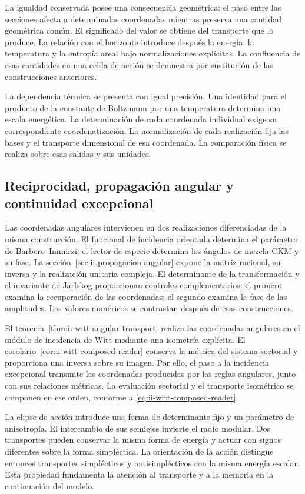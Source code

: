 La igualdad conservada posee una consecuencia geométrica:
el paso entre las secciones afecta a determinadas coordenadas mientras
preserva una cantidad geométrica común. El significado del valor se
obtiene del transporte que lo produce. La relación con el horizonte
introduce después la energía, la temperatura y la entropía areal bajo
normalizaciones explícitas. La confluencia de esas cantidades en una
celda de acción se demuestra por sustitución de las construcciones
anteriores.

La dependencia térmica se presenta con igual precisión. Una identidad
para el producto de la constante de Boltzmann por una temperatura
determina una escala energética. La determinación de cada coordenada
individual exige su correspondiente coordenatización. La normalización de cada realización fija las bases y el transporte
dimensional de esa coordenada.
La comparación física se realiza sobre esas salidas y sus unidades.

\subsection{Reciprocidad, propagación angular y continuidad excepcional}

Las coordenadas angulares intervienen en dos realizaciones diferenciadas
de la misma construcción. El funcional de incidencia orientada determina
el parámetro de Barbero--Immirzi; el lector de especie determina los
ángulos de mezcla CKM y su fase. La sección~\ref{sec:ii-propagacion-angular}
expone la matriz racional, su inversa y la realización unitaria compleja.
El determinante de la transformación y el invariante de Jarlskog
proporcionan controles complementarios: el primero examina la recuperación
de las coordenadas; el segundo examina la fase de las amplitudes. Los
valores numéricos se contrastan después de esas construcciones.

El teorema~\ref{thm:ii-witt-angular-transport} realiza las coordenadas
angulares en el módulo de incidencia de Witt mediante una isometría
explícita. El corolario~\ref{cor:ii-witt-composed-reader} conserva la
métrica del sistema sectorial y proporciona una inversa sobre su imagen.
Por ello, el paso a la incidencia excepcional transmite las coordenadas
producidas por las reglas angulares, junto con sus relaciones métricas.
La evaluación sectorial y el transporte isométrico se componen en ese
orden, conforme a \eqref{eq:ii-witt-composed-reader}.

La elipse de acción introduce una forma de determinante fijo y un
parámetro de anisotropía. El intercambio de sus semiejes invierte el
radio modular. Dos transportes pueden conservar la misma forma de
energía y actuar con signos diferentes sobre la forma simpléctica.
La orientación de la acción distingue entonces transportes simplécticos
y antisimplécticos con la misma energía escalar. Esta propiedad fundamenta
la atención al transporte y a la memoria en la continuación del modelo.

